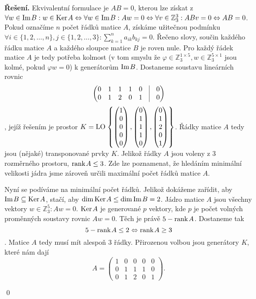 \documentclass{article}
\theoremstyle{definition}
\theoremstyle{plain}
\newcommand{\Z}{\mathbb{Z}}
\newcommand{\vker}{\text{Ker\hspace{0.1em}}}
\newcommand{\vim}{\text{Im\hspace{0.1em}}}
\newcommand{\LO}{\text{LO\hspace{0.1em}}}
\newenvironment{reseni}{\noindent\textbf{Řešení.}\hspace{0.5em}}{\hfill\qed\medskip}
\begin{document}
\begin{reseni}
Ekvivalentní formulace je $AB = 0$, kterou lze získat z
$\forall w \in \vim B: w \in \vker A \Leftrightarrow \forall w \in \vim B: A w = 0 \Leftrightarrow \forall v \in \Z_3^3: A B v = 0 \Leftrightarrow AB = 0$. Pokud označíme $n$ počet řádků matice $A$, 
získáme užitečnou podmínku $\forall i \in \{1, 2, \dots, n\}, j \in \{1, 2, \dots, 3\}: \sum_{k=1}^n a_{ik} b_{kj} = 0$. Řečeno slovy, 
součin každého řádku matice $A$ a každého sloupce matice $B$ je roven nule.
Pro každý řádek matice $A$ je tedy potřeba kolmost (v tom smyslu že $\varphi \in \Z_3^{1\times 5}, w \in \Z_3^{5\times1}$ jsou kolmé, pokud $\varphi w = 0$) k generátorům $\vim B$.
Dostaneme soustavu lineárních rovnic
\[
\begin{pmatrix}
0 & 1 & 1 & 1 & 0 & \vline & 0 \\
0 & 1 & 2 & 0 & 1 & \vline & 0
\end{pmatrix}
\],
jejíž řešením je prostor $K = \LO \left\{ \begin{pmatrix} 1 \\ 0 \\ 0 \\ 0 \\ 0 \end{pmatrix}, \begin{pmatrix} 0 \\ 1 \\ 1 \\ 1 \\ 0 \end{pmatrix}, \begin{pmatrix} 0 \\ 1 \\ 2 \\ 0 \\ 1 \end{pmatrix} \right\}$.
Řádky matice $A$ tedy jsou (nějaké) transponované prvky $K$. Jelikož řádky $A$ jsou voleny z 3 rozměrného prostoru, $\text{rank\hspace{0.1em}} A \le 3$.
Zde lze poznamenat, že hledáním minimální velikosti jádra jsme zároveň určili maximální počet řádků matice $A$.

Nyní se podíváme na minimální počet řádků. Jelikož dokážeme zařídit, aby $\vim B \subseteq \vker A$, 
stačí, aby $\dim \vker A \le \dim \vim B = 2$.
Jádro matice $A$ jsou všechny vektory $w \in \Z_3^5: A w = 0$. 
$\vker A$ je generované $p$ vektory, kde $p$ je počet volných proměnných soustavy rovnic $A w = 0$.
Těch je právě $5 - \text{rank\hspace{0.1em}} A$. Dostaneme tak
$$ 5 - \text{rank\hspace{0.1em}} A \le 2 \Leftrightarrow \text{rank\hspace{0.1em}} A \ge 3 $$
. Matice $A$ tedy musí mít alespoň 3 řádky. Přirozenou volbou jsou generátory $K$, které nám dají
\[
A=\begin{pmatrix}
1 & 0 & 0 & 0 & 0 \\
0 & 1 & 1 & 1 & 0 \\
0 & 1 & 2 & 0 & 1
\end{pmatrix}.
\]

\end{reseni}
\end{document}

